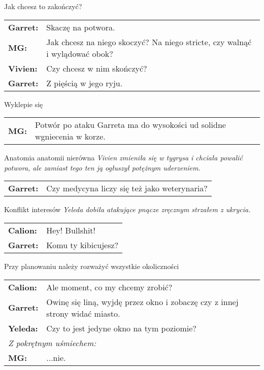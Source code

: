 \documentclass[10pt,twoside,twocolumn]{book}
\begin{document}
\begin{rpg-quotebox}{Jak chcesz to zakończyć?}
   \begin{tabularx}{\columnwidth}{lX}
      \textbf{Garret:} & Skaczę na potwora.\\
      \textbf{MG:} & Jak chcesz na niego skoczyć? Na niego stricte, czy walnąć i wylądować obok?\\
      \textbf{Vivien:} & Czy chcesz w nim skończyć?\\
      \textbf{Garret:} & Z pięścią w jego ryju.\\
   \end{tabularx}
\end{rpg-quotebox}

\begin{rpg-quotebox}{Wyklepie się}
   \begin{tabularx}{\columnwidth}{lX}
      \textbf{MG:} & Potwór po ataku Garreta ma do wysokości ud solidne wgniecenia w korze.\\
   \end{tabularx}
\end{rpg-quotebox}

\begin{rpg-quotebox}{Anatomia anatomii nierówna}
   \textit{Vivien zmieniła się w tygrysa i chciała powalić potwora, ale zamiast tego ten ją ogłuszył potężnym uderzeniem.}\\

   \begin{tabularx}{\columnwidth}{lX}
      \textbf{Garret:} & Czy medycyna liczy się też jako weterynaria?\\
   \end{tabularx}
\end{rpg-quotebox}

\begin{rpg-quotebox}{Konflikt interesów}
   \textit{Yeleda dobiła atakujące pnącze zręcznym strzałem z ukrycia.}\\

   \begin{tabularx}{\columnwidth}{lX}
      \textbf{Calion:} & Hey! Bullshit!\\
      \textbf{Garret:} & Komu ty kibicujesz?\\
   \end{tabularx}
\end{rpg-quotebox}

\begin{rpg-quotebox}{Przy planowaniu należy rozważyć wszystkie okoliczności}
   \begin{tabularx}{\columnwidth}{lX}
      \textbf{Calion:} & Ale moment, co my chcemy zrobić?\\
      \textbf{Garret:} & Owinę się liną, wyjdę przez okno i zobaczę czy z innej strony widać miasto.\\
      \textbf{Yeleda:} & Czy to jest jedyne okno na tym poziomie?\\
      \multicolumn{2}{l}{\textit{Z pokrętnym uśmiechem:}}\\
      \textbf{MG:} & ...nie.\\
   \end{tabularx}
\end{rpg-quotebox}
\end{document}
